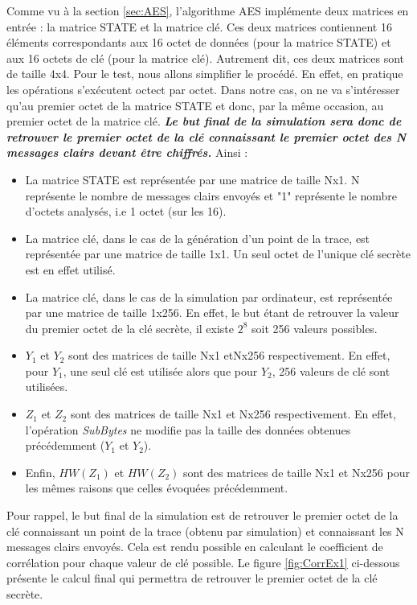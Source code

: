 \documentclass[10pt, oneside, a4paper]{article}
\begin{document}
\vspace{-0.3 cm}Comme vu à la section \ref{sec:AES}, l'algorithme AES implémente deux matrices en entrée : la matrice STATE et la matrice clé. Ces deux matrices contiennent 16 éléments correspondants aux 16 octet de données (pour la matrice STATE) et aux 16 octets de clé (pour la matrice clé). Autrement dit, ces deux matrices sont de taille 4x4. Pour le test, nous allons simplifier le procédé. En effet, en pratique les opérations s'exécutent octect par octet. Dans notre cas, on ne va s'intéresser qu'au premier octet de la matrice STATE et donc, par la même occasion, au premier octet de la matrice clé. \textbf{\textit{Le but final de la simulation sera donc de retrouver le premier octet de la clé connaissant le premier octet des N messages clairs devant être chiffrés.}}
Ainsi :
\begin{itemize}
\item La matrice STATE est représentée par une matrice de taille Nx1. N représente le nombre de messages clairs envoyés et "1" représente le nombre d'octets analysés, i.e 1 octet (sur les 16).
\item La matrice clé, dans le cas de la génération d'un point de la trace, est représentée par une matrice de taille 1x1. Un seul octet de l'unique clé secrète est en effet utilisé.
\item La matrice clé, dans le cas de la simulation par ordinateur, est représentée par une matrice de taille 1x256. En effet, le but étant de retrouver la valeur du premier octet de la clé secrète, il existe $2^8$ soit 256 valeurs possibles.
\item $Y_1$ et $Y_2$ sont des matrices de taille Nx1 etNx256 respectivement. En effet, pour $Y_1$, une seul clé est utilisée alors que pour $Y_2$, 256 valeurs de clé sont utilisées.
\item $Z_1$ et $Z_2$ sont des matrices de taille Nx1 et Nx256 respectivement. En effet, l'opération \textit{SubBytes} ne modifie pas la taille des données obtenues précédemment ($Y_1$ et $Y_2$).
\item Enfin, $HW(Z_1)$ et $HW(Z_2)$ sont des matrices de taille Nx1 et Nx256 pour les mêmes raisons que celles évoquées précédemment. \\
\end{itemize}

\vspace{-0.2 cm}Pour rappel, le but final de la simulation est de retrouver le premier octet de la clé connaissant un point de la trace (obtenu par simulation) et connaissant les N messages clairs envoyés. Cela est rendu possible en calculant le coefficient de corrélation pour chaque valeur de clé possible. Le figure \ref{fig:CorrEx1} ci-dessous présente le calcul final qui permettra de retrouver le premier octet de la clé secrète.
\end{document}
